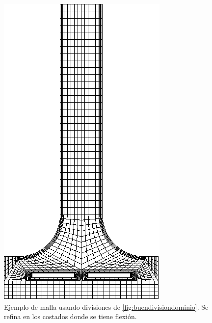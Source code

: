 \documentclass[11pt, a4paper,titlepage]{article}
\begin{document}
\begin{figure}[htb!]
	\centering
	\includegraphics[angle=90,width=\linewidth]{fig/mallaPelton.eps}
	\caption{Ejemplo de malla usando divisiones de  \ref{fig:buendivisiondominio}. Se refina en los costados donde se tiene flexión.}
\end{figure}
\end{document}
